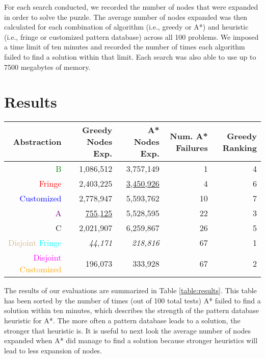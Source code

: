 \documentclass[letterpaper]{article}
\begin{document}
For each search conducted, we recorded the number of nodes that were expanded in order to solve the puzzle.  The average number of nodes expanded was then calculated for each combination of algorithm (i.e., greedy or A*) and heuristic (i.e., fringe or customized pattern database) across all 100 problems.  We imposed a time limit of ten minutes and recorded the number of times each algorithm failed to find a solution within that limit.  Each search was also able to use up to 7500 megabytes of memory.

\section{Results}

\begin{table*}
\centering
\begin{tabular}{ r | r | r | r | r }
      Abstraction  & Greedy Nodes Exp.     & A* Nodes Exp. & Num. A* Failures & Greedy Ranking\\ \hline 
\textcolor{green}{B}                                         &  1,086,512  & 3,757,149 &  1 & 4\\ 
\textcolor{red}{Fringe}                                      &  2,403,225  & \underline{3,450,926} &  4 & 6\\ 
\textcolor{blue}{Customized}                                 &  2,778,947  & 5,593,762 & 10 & 7\\ 
\textcolor{Purple}{A}                                        &    \underline{755,125}  & 5,528,595 & 22 & 3\\ 
\textcolor{RawSienna}{C}                                     &  2,021,907  & 6,259,867 & 26 & 5\\ 
\textcolor{Tan}{Disjoint} \textcolor{cyan}{Fringe}           &     \textit{44,171}  &   \textit{218,816} & 67 & 1\\ 
\textcolor{magenta}{Disjoint} \textcolor{orange}{Customized} &    196,073  &   333,928 & 67 & 2\\ 
\end{tabular}
\caption{average number of nodes expanded, sorted by the number of times A* failed to find a solution.}
\label{table:results}
\end{table*}

The results of our evaluations are summarized in Table \ref{table:results}.  This table has been sorted by the number of times (out of 100 total tests) A* failed to find a solution within ten minutes, which describes the strength of the pattern database heuristic for A*.  The more often a pattern database leads to a solution, the stronger that heuristic is.  It is useful to next look the average number of nodes expanded when A* did manage to find a solution because stronger heuristics will lead to less expansion of nodes.
\end{document}
